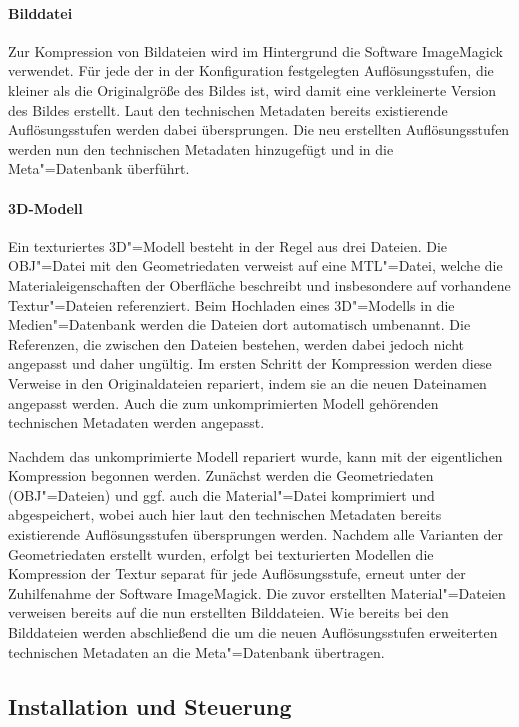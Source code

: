 \paragraph{Bilddatei}

Zur Kompression von Bildateien wird im Hintergrund die Software ImageMagick verwendet. Für jede der in der Konfiguration festgelegten Auflösungsstufen, die kleiner als die Originalgröße des Bildes ist, wird damit eine verkleinerte Version des Bildes erstellt. Laut den technischen Metadaten bereits existierende Auflösungsstufen werden dabei übersprungen. Die neu erstellten Auflösungsstufen werden nun den technischen Metadaten hinzugefügt und in die Meta"=Datenbank überführt.

\paragraph{3D-Modell}

Ein texturiertes 3D"=Modell besteht in der Regel aus drei Dateien. Die OBJ"=Datei mit den Geometriedaten verweist auf eine MTL"=Datei, welche die Materialeigenschaften der Oberfläche beschreibt und insbesondere auf vorhandene Textur"=Dateien referenziert. Beim Hochladen eines 3D"=Modells in die Medien"=Datenbank werden die Dateien dort automatisch umbenannt. Die Referenzen, die zwischen den Dateien bestehen, werden dabei jedoch nicht angepasst und daher ungültig. Im ersten Schritt der Kompression werden diese Verweise in den Originaldateien repariert, indem sie an die neuen Dateinamen angepasst werden. Auch die zum unkomprimierten Modell gehörenden technischen Metadaten werden angepasst.

Nachdem das unkomprimierte Modell repariert wurde, kann mit der eigentlichen Kompression begonnen werden. Zunächst werden die Geometriedaten (OBJ"=Dateien) und ggf. auch die Material"=Datei komprimiert und abgespeichert, wobei auch hier laut den technischen Metadaten bereits existierende Auflösungsstufen übersprungen werden. Nachdem alle Varianten der Geometriedaten erstellt wurden, erfolgt bei texturierten Modellen die Kompression der Textur separat für jede Auflösungsstufe, erneut unter der Zuhilfenahme der Software ImageMagick. Die zuvor erstellten Material"=Dateien verweisen bereits auf die nun erstellten Bilddateien. Wie bereits bei den Bilddateien werden abschließend die um die neuen Auflösungsstufen erweiterten technischen Metadaten an die Meta"=Datenbank übertragen.

\subsection{Installation und Steuerung }


